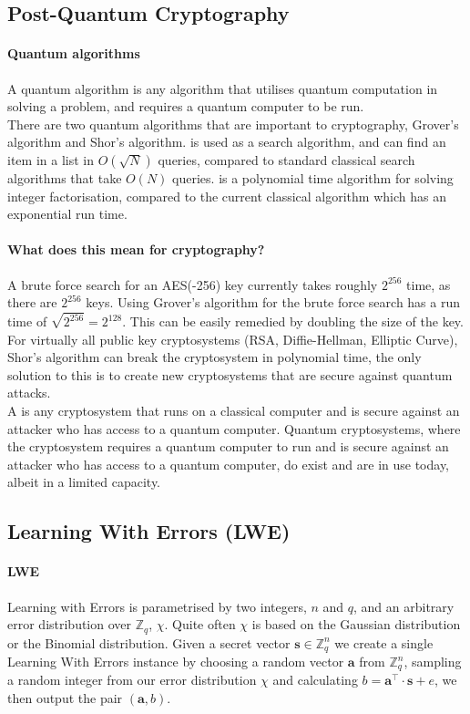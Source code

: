 \documentclass[a4paper, 11pt, openany]{book}
\begin{document}
\subsection{Post-Quantum Cryptography}

\paragraph{Quantum algorithms}
A quantum algorithm is any algorithm that utilises quantum computation in solving a problem, and requires a quantum computer to be run.
\\
There are two quantum algorithms that are important to cryptography, Grover's algorithm and Shor's algorithm.  is used as a search algorithm, and can find an item in a list in $O(\sqrt{N})$ queries, compared to standard classical search algorithms that take $O(N)$ queries.  is a polynomial time algorithm for solving integer factorisation, compared to the current classical algorithm which has an exponential run time.
\paragraph{What does this mean for cryptography?}
A brute force search for an AES(-256) key currently takes roughly $2^{256}$ time, as there are $2^{256}$ keys. Using Grover's algorithm for the brute force search has a run time of $\sqrt{2^{256}} = 2^{128}$. This can be easily remedied by doubling the size of the key. For virtually all public key cryptosystems (RSA, Diffie-Hellman, Elliptic Curve), Shor's algorithm can break the cryptosystem in polynomial time, the only solution to this is to create new cryptosystems that are secure against quantum attacks.
\\
A  is any cryptosystem that runs on a classical computer and is secure against an attacker who has access to a quantum computer.
Quantum cryptosystems, where the cryptosystem requires a quantum computer to run and is secure against an attacker who has access to a quantum computer, do exist and are in use today, albeit in a limited capacity.
\subsection{Learning With Errors (LWE)}
\paragraph{LWE}
Learning with Errors is parametrised by two integers, $n$ and $q$, and an arbitrary error distribution over $\mathbb{Z}_{q}$, $\chi$. Quite often $\chi$ is based on the Gaussian distribution or the Binomial distribution. Given a secret vector $\textbf{s} \in \mathbb{Z}_{q}^{n}$ we create a single Learning With Errors instance by choosing a random vector $\textbf{a}$ from $\mathbb{Z}_{q}^{n}$, sampling a random integer from  our error distribution $\chi$ and calculating $b = \textbf{a}^{\top}\cdot\textbf{s} + e$, we then output the pair $(\textbf{a},b)$.
\end{document}
